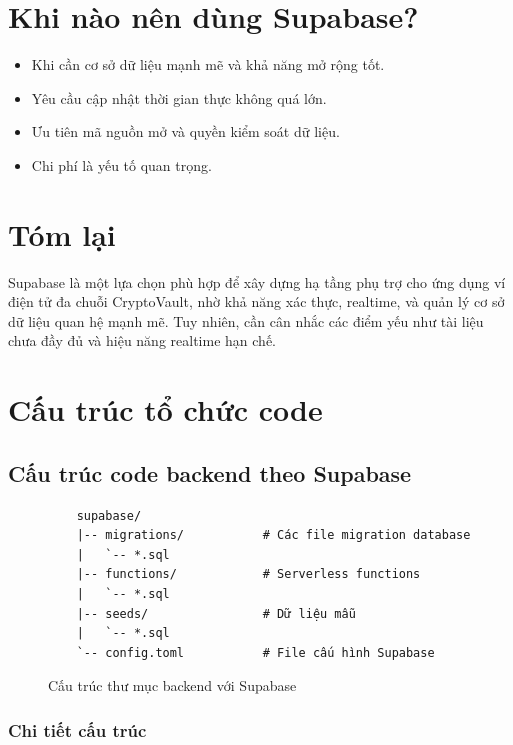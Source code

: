 \documentclass[a4paper]{report}
\begin{document}
\section*{Khi nào nên dùng Supabase?}
\begin{itemize}
    \item Khi cần cơ sở dữ liệu mạnh mẽ và khả năng mở rộng tốt.
    \item Yêu cầu cập nhật thời gian thực không quá lớn.
    \item Ưu tiên mã nguồn mở và quyền kiểm soát dữ liệu.
    \item Chi phí là yếu tố quan trọng.
\end{itemize}

\section*{Tóm lại}
Supabase là một lựa chọn phù hợp để xây dựng hạ tầng phụ trợ cho ứng dụng ví điện tử đa chuỗi CryptoVault, nhờ khả năng xác thực, realtime, và quản lý cơ sở dữ liệu quan hệ mạnh mẽ. Tuy nhiên, cần cân nhắc các điểm yếu như tài liệu chưa đầy đủ và hiệu năng realtime hạn chế.
\section{Cấu trúc tổ chức code}

\subsection{Cấu trúc code backend theo Supabase}

\begin{figure}[h]
    \centering
    \begin{verbatim}
    supabase/
    |-- migrations/           # Các file migration database
    |   `-- *.sql
    |-- functions/            # Serverless functions
    |   `-- *.sql
    |-- seeds/                # Dữ liệu mẫu
    |   `-- *.sql
    `-- config.toml           # File cấu hình Supabase
    \end{verbatim}
    \caption{Cấu trúc thư mục backend với Supabase}
    \label{fig:backend-structure}
\end{figure}

\subsubsection{Chi tiết cấu trúc}
\end{document}
